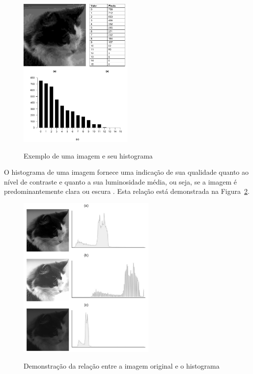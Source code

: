\documentclass[12pt,oneside,a4paper,english,french,spanish,brazil,]{abntex2}
\begin{document}
\begin{figure}[ht]
\centering
\caption{Exemplo de uma imagem e seu histograma}
\includegraphics[width=0.5\textwidth]{imagens/PDI_Histograma.pdf}
\sourceAuthor
\label{fig:PDI_Histograma}
\end{figure}

O histograma de uma imagem fornece uma indicação de sua qualidade quanto ao nível de contraste e quanto a sua luminosidade média, ou seja, se a imagem é predominantemente clara ou escura \cite{conci:2003}. Esta relação está demonstrada na Figura~\ref{fig:PDI_Histograma_2}.

\begin{figure}[ht]
\centering
\caption{Demonstração da relação entre a imagem original e o histograma}
\includegraphics[width=0.6\textwidth]{imagens/PDI_Histograma_2.pdf}
\sourceAuthor
\label{fig:PDI_Histograma_2}
\end{figure}
\end{document}
